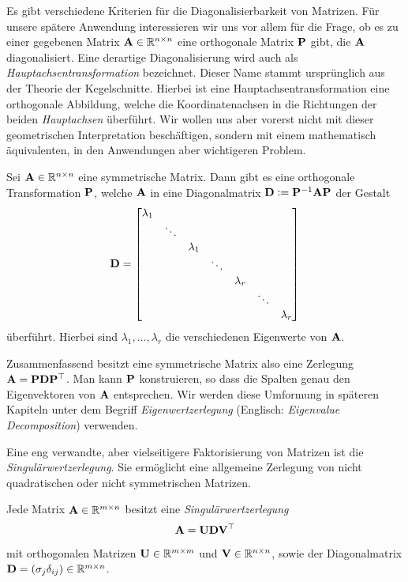 Es gibt verschiedene Kriterien für die Diagonalisierbarkeit von Matrizen. Für unsere spätere Anwendung interessieren wir uns vor allem für die Frage, ob es zu einer gegebenen Matrix $\mathbf{A} \in \mathbb{R}^{n \times n}$ eine orthogonale Matrix $\mathbf{P}$ gibt, die $\mathbf{A}$ diagonalisiert. Eine derartige Diagonalisierung wird auch als \textit{Hauptachsentransformation} bezeichnet. Dieser Name stammt ursprünglich aus der Theorie der Kegelschnitte. Hierbei ist eine Hauptachsentransformation eine orthogonale Abbildung, welche die Koordinatenachsen in die Richtungen der beiden \textit{Hauptachsen} überführt. Wir wollen uns aber vorerst nicht mit dieser geometrischen Interpretation beschäftigen, sondern mit einem mathematisch äquivalenten, in den Anwendungen aber wichtigeren Problem.

\begin{thm}
Sei $\mathbf{A} \in \mathbb{R}^{n \times n}$ eine symmetrische Matrix. Dann gibt es eine orthogonale Transformation $\mathbf{P}$, welche $\mathbf{A}$ in eine Diagonalmatrix $\mathbf{D} \vcentcolon= \mathbf{P}^{-1}\mathbf{A}\mathbf{P}$ der Gestalt
$$\mathbf{D} = \begin{bmatrix}
    \lambda_{1} & & & & & & \\
    & \ddots & & & & & \\
    & & \lambda_1 & & & & \\
    & & & \ddots & & & \\
    & & & &\lambda_r & & \\
    & & & & & \ddots & \\
    & & & & & & \lambda_{r}
  \end{bmatrix}$$
überführt. Hierbei sind $\lambda_1, \ldots, \lambda_r$ die verschiedenen Eigenwerte von $\mathbf{A}$.
\end{thm}

Zusammenfassend besitzt eine symmetrische Matrix also eine Zerlegung $\mathbf{A} = \mathbf{P} \mathbf{D} \mathbf{P}^{\top}$. Man kann $\mathbf{P}$ konstruieren, so dass die Spalten genau den Eigenvektoren von $\mathbf{A}$ entsprechen. Wir werden diese Umformung in späteren Kapiteln unter dem Begriff \textit{Eigenwertzerlegung} (Englisch: \textit{Eigenvalue Decomposition}) verwenden. 

Eine eng verwandte, aber vielseitigere Faktorisierung von Matrizen ist die \textit{Singulärwertzerlegung}. Sie ermöglicht eine allgemeine Zerlegung von nicht quadratischen oder nicht symmetrischen Matrizen.

\begin{thm}
Jede Matrix $\mathbf{A} \in \mathbb{R}^{m \times n}$ besitzt eine \textit{Singulärwertzerlegung} 
$$\mathbf{A} = \mathbf{U}\mathbf{D}\mathbf{V}^{\top}$$
mit orthogonalen Matrizen $\mathbf{U} \in \mathbb{R}^{m \times m}$ und $\mathbf{V} \in \mathbb{R}^{n \times n}$, sowie der Diagonalmatrix $\mathbf{D} = (\sigma_j\delta_{ij}) \in \mathbb{R}^{m \times n}$.
\end{thm}

